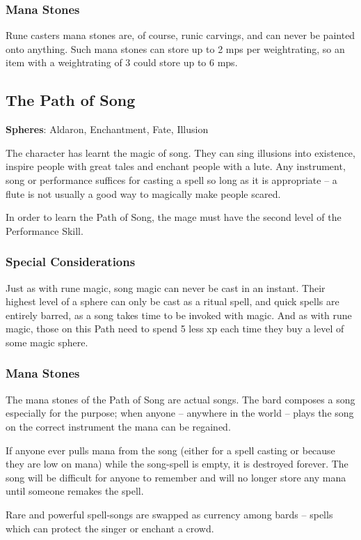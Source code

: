 \begin{multicols}{2}
\subsubsection{Mana Stones}

Rune casters mana stones are, of course, runic carvings, and can never be painted onto anything.
Such mana stones can store up to 2 \glspl{mp} per \gls{weightrating}, so an item with a \gls{weightrating} of 3 could store up to 6 \glspl{mp}.

\subsection{The Path of Song}

\label{song}\textbf{Spheres}: Aldaron, Enchantment, Fate, Illusion

The character has learnt the magic of song. They can sing illusions into existence, inspire people with great tales and enchant people with a lute. Any instrument, song or performance suffices for casting a spell so long as it is appropriate -- a flute is not usually a good way to magically make people scared.

In order to learn the Path of Song, the mage must have the second level of the Performance Skill. 

\subsubsection{Special Considerations}

Just as with rune magic, song magic can never be cast in an instant.  Their highest level of a sphere can only be cast as a ritual spell, and quick spells are entirely barred, as a song takes time to be invoked with magic.  And as with rune magic, those on this Path need to spend 5 less \gls{xp} each time they buy a level of some magic sphere.

\subsubsection{Mana Stones}

The mana stones of the Path of Song are actual songs.
The bard composes a song especially for the purpose; when anyone -- anywhere in the world -- plays the song on the correct instrument the mana can be regained.

If anyone ever pulls mana from the song (either for a spell casting or because they are low on mana) while the song-spell is empty, it is destroyed forever.
The song will be difficult for anyone to remember and will no longer store any mana until someone remakes the spell.

Rare and powerful spell-songs are swapped as currency among bards -- spells which can protect the singer or enchant a crowd.

\end{multicols}

